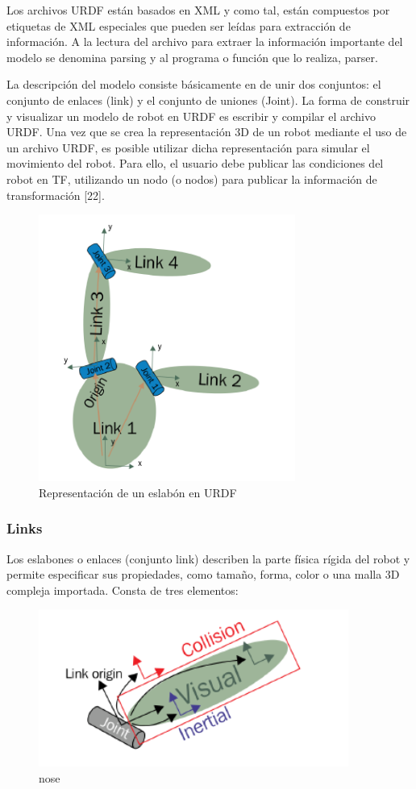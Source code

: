         Los archivos URDF están basados en XML y como tal, están compuestos por etiquetas de XML especiales que pueden ser leídas para extracción de información. A la lectura del archivo para extraer la información importante del modelo se denomina parsing y al programa o función que lo realiza, parser.
        
        La descripción del modelo consiste básicamente en de unir dos conjuntos: el conjunto de enlaces (link) y el conjunto de uniones (Joint). La forma de construir y visualizar un modelo de robot en URDF es escribir y compilar el archivo URDF. Una vez que se crea la representación 3D de un robot mediante el uso de un archivo URDF, es posible utilizar dicha representación para simular el movimiento del robot. Para ello, el usuario debe publicar las condiciones del robot en TF, utilizando un nodo (o nodos) para publicar la información de transformación [22].
        
        \begin{figure}[htb]
            \centering
            \includegraphics[width=0.5\linewidth]{Main/Chapter3/Images3/3-7/representacion-de-eslabon-en-urdf.png}
            \caption{Representación de un eslabón en URDF}
            \label{f:Cap3-7_eslabon_urdf}
        \end{figure} 
        
        \subsubsection{Links}
        
        Los eslabones o enlaces (conjunto link) describen la parte física rígida del robot y permite especificar sus propiedades, como tamaño, forma, color o una malla 3D compleja importada. Consta de tres elementos:
    
        \begin{figure}[htb]
            \centering
            \includegraphics[width=0.5\linewidth]{Main/Chapter3/Images3/3-7/eslabon2.png}
            \caption{nose}
            \label{f:Cap3-7_noseee_urdf}
        \end{figure} 


